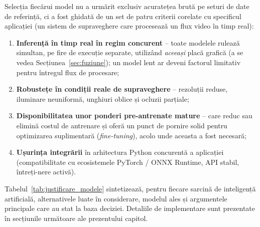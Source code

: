 \documentclass[../../main.tex]{subfiles}
\begin{document}
Selecția fiecărui model nu a urmărit exclusiv acuratețea brută pe seturi de date de referință, ci a fost ghidată de un set de patru criterii corelate cu specificul aplicației (un sistem de supraveghere care procesează un flux video în timp real):

\begin{enumerate}
	\item \textbf{Inferență în timp real în regim concurent} -- toate modelele rulează simultan, pe fire de execuție separate, utilizând \textit{aceeași} placă grafică (a se vedea Secțiunea~\ref{sec:fuziune}); un model lent ar deveni factorul limitativ pentru întregul flux de procesare;
	\item \textbf{Robustețe în condiții reale de supraveghere} -- rezoluții reduse, iluminare neuniformă, unghiuri oblice și ocluzii parțiale;
	\item \textbf{Disponibilitatea unor ponderi pre-antrenate mature} -- care reduc sau elimină costul de antrenare și oferă un punct de pornire solid pentru optimizarea suplimentară (\textit{fine-tuning}), acolo unde aceasta a fost necesară;
	\item \textbf{Ușurința integrării} în arhitectura Python concurentă a aplicației (compatibilitate cu ecosistemele PyTorch / ONNX Runtime, API stabil, întreți-nere activă).
\end{enumerate}

Tabelul~\ref{tab:justificare_modele} sintetizează, pentru fiecare sarcină de inteligență artificială, alternativele luate în considerare, modelul ales și argumentele principale care au stat la baza deciziei. Detaliile de implementare sunt prezentate în secțiunile următoare ale prezentului capitol.
\end{document}
